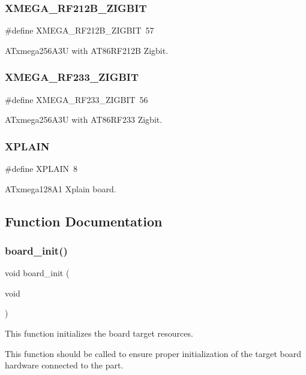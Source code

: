 \subsubsection{\texorpdfstring{XMEGA\_RF212B\_ZIGBIT}{XMEGA\_RF212B\_ZIGBIT}}
{\footnotesize\ttfamily \#define X\+M\+E\+G\+A\+\_\+\+R\+F212\+B\+\_\+\+Z\+I\+G\+B\+IT~57}



A\+Txmega256\+A3U with A\+T86\+R\+F212B Zigbit. 

\mbox{\label{group__group__common__boards_ga1364d2c99873446ea8c511ec29f50a8f}} 
\subsubsection{\texorpdfstring{XMEGA\_RF233\_ZIGBIT}{XMEGA\_RF233\_ZIGBIT}}
{\footnotesize\ttfamily \#define X\+M\+E\+G\+A\+\_\+\+R\+F233\+\_\+\+Z\+I\+G\+B\+IT~56}



A\+Txmega256\+A3U with A\+T86\+R\+F233 Zigbit. 

\mbox{\label{group__group__common__boards_ga5c3d6ea6d4027a39a00ab973ec088853}} 
\subsubsection{\texorpdfstring{XPLAIN}{XPLAIN}}
{\footnotesize\ttfamily \#define X\+P\+L\+A\+IN~8}



A\+Txmega128\+A1 Xplain board. 



\subsection{Function Documentation}
\mbox{\label{group__group__common__boards_ga916f2adc2080b4fe88034086d107a8dc}} 
\subsubsection{\texorpdfstring{board\_init()}{board\_init()}}
{\footnotesize\ttfamily void board\+\_\+init (\begin{DoxyParamCaption}\item[{void}]{ }\end{DoxyParamCaption})}



This function initializes the board target resources. 

This function should be called to ensure proper initialization of the target board hardware connected to the part. 